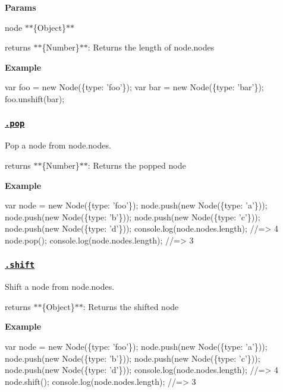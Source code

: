 {\bfseries Params}


\begin{DoxyItemize}
\item {\ttfamily node} $\ast$$\ast$\{Object\}$\ast$$\ast$
\item {\ttfamily returns} $\ast$$\ast$\{Number\}$\ast$$\ast$\+: Returns the length of {\ttfamily node.\+nodes}
\end{DoxyItemize}

{\bfseries Example}


\begin{DoxyCode}
var foo = new Node(\{type: 'foo'\});
var bar = new Node(\{type: 'bar'\});
foo.unshift(bar);
\end{DoxyCode}


\subsubsection*{\href{index.js#L167}{\tt .pop}}

Pop a node from {\ttfamily node.\+nodes}.


\begin{DoxyItemize}
\item {\ttfamily returns} $\ast$$\ast$\{Number\}$\ast$$\ast$\+: Returns the popped {\ttfamily node}
\end{DoxyItemize}

{\bfseries Example}


\begin{DoxyCode}
var node = new Node(\{type: 'foo'\});
node.push(new Node(\{type: 'a'\}));
node.push(new Node(\{type: 'b'\}));
node.push(new Node(\{type: 'c'\}));
node.push(new Node(\{type: 'd'\}));
console.log(node.nodes.length);
//=> 4
node.pop();
console.log(node.nodes.length);
//=> 3
\end{DoxyCode}


\subsubsection*{\href{index.js#L190}{\tt .shift}}

Shift a node from {\ttfamily node.\+nodes}.


\begin{DoxyItemize}
\item {\ttfamily returns} $\ast$$\ast$\{Object\}$\ast$$\ast$\+: Returns the shifted {\ttfamily node}
\end{DoxyItemize}

{\bfseries Example}


\begin{DoxyCode}
var node = new Node(\{type: 'foo'\});
node.push(new Node(\{type: 'a'\}));
node.push(new Node(\{type: 'b'\}));
node.push(new Node(\{type: 'c'\}));
node.push(new Node(\{type: 'd'\}));
console.log(node.nodes.length);
//=> 4
node.shift();
console.log(node.nodes.length);
//=> 3
\end{DoxyCode}


